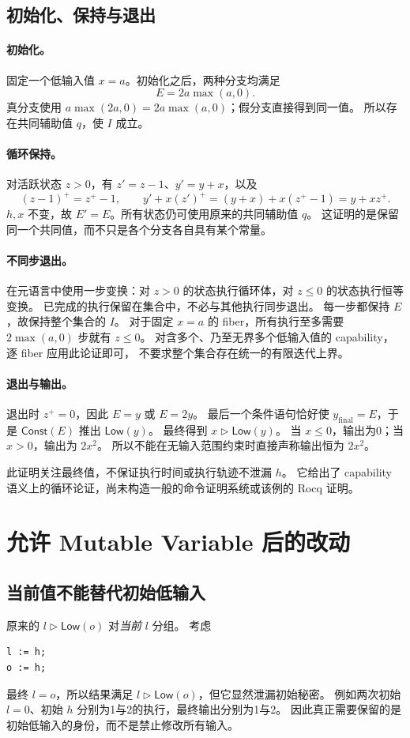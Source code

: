 \documentclass[UTF8,a4paper,11pt,fontset=fandol]{ctexart}
\newcommand{\Low}{\mathsf{Low}}
\newcommand{\Const}{\mathsf{Const}}
\begin{document}
\subsection{初始化、保持与退出}
\paragraph{初始化。}
固定一个低输入值 $x=a$。初始化之后，两种分支均满足
\[
 E=2a\max(a,0).
\]
真分支使用 $a\max(2a,0)=2a\max(a,0)$；假分支直接得到同一值。
所以存在共同辅助值 $q$，使 $I$ 成立。

\paragraph{循环保持。}
对活跃状态 $z>0$，有 $z'=z-1$、$y'=y+x$，以及
\[
 (z-1)^+=z^+-1,\qquad
 y'+x(z')^+=(y+x)+x(z^+-1)=y+xz^+.
\]
$h,x$ 不变，故 $E'=E$。所有状态仍可使用原来的共同辅助值 $q$。
这证明的是保留同一个共同值，而不只是各个分支各自具有某个常量。

\paragraph{不同步退出。}
在元语言中使用一步变换：对 $z>0$ 的状态执行循环体，对 $z\le0$ 的状态执行恒等变换。
已完成的执行保留在集合中，不必与其他执行同步退出。
每一步都保持 $E$，故保持整个集合的 $I$。
对于固定 $x=a$ 的 fiber，所有执行至多需要 $2\max(a,0)$ 步就有 $z\le0$。
对含多个、乃至无界多个低输入值的 capability，逐 fiber 应用此论证即可，
不要求整个集合存在统一的有限迭代上界。

\paragraph{退出与输出。}
退出时 $z^+=0$，因此 $E=y$ 或 $E=2y$。
最后一个条件语句恰好使 $y_{\mathrm{final}}=E$，于是 $\Const(E)$ 推出 $\Low(y)$。
最终得到 $x\triangleright\Low(y)$。
当 $x\le0$，输出为0；当 $x>0$，输出为 $2x^2$。
所以不能在无输入范围约束时直接声称输出恒为 $2x^2$。

此证明关注最终值，不保证执行时间或执行轨迹不泄漏 $h$。
它给出了 capability 语义上的循环论证，尚未构造一般的命令证明系统或该例的 Rocq 证明。

\section{允许 Mutable Variable 后的改动}

\subsection{当前值不能替代初始低输入}
原来的 $l\triangleright\Low(o)$ 对\emph{当前} $l$ 分组。
考虑
\begin{verbatim}
l := h;
o := h;
\end{verbatim}
最终 $l=o$，所以结果满足 $l\triangleright\Low(o)$，但它显然泄漏初始秘密。
例如两次初始 $l=0$、初始 $h$ 分别为1与2的执行，最终输出分别为1与2。
因此真正需要保留的是初始低输入的身份，而不是禁止修改所有输入。
\end{document}
